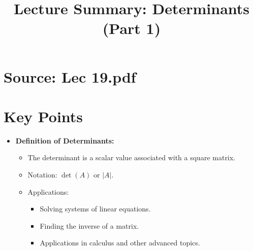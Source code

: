 \documentclass{article}
\title{Lecture Summary: Determinants (Part 1)}
\author{}
\date{}
\begin{document}
\maketitle

\section*{Source: Lec 19.pdf}

\section*{Key Points}

\begin{itemize}
  \item \textbf{Definition of Determinants:}
    \begin{itemize}
      \item The determinant is a scalar value associated with a square matrix.
      \item Notation: $\det(A)$ or $|A|$.
      \item Applications:
        \begin{itemize}
          \item Solving systems of linear equations.
          \item Finding the inverse of a matrix.
          \item Applications in calculus and other advanced topics.
        \end{itemize}
    \end{itemize}


\end{itemize}
\end{document}

